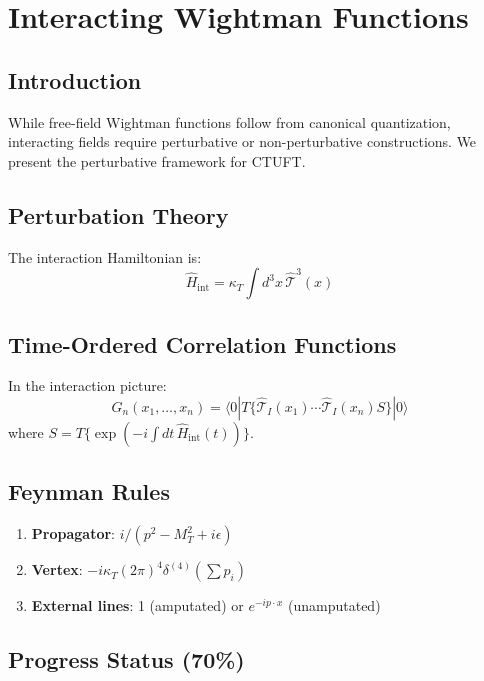 \section{Interacting Wightman Functions}
\label{sec:wightman_functions}

\subsection{Introduction}

While free-field Wightman functions follow from canonical quantization, interacting fields require perturbative or non-perturbative constructions. We present the perturbative framework for CTUFT.

\subsection{Perturbation Theory}

The interaction Hamiltonian is:
\begin{equation}
    \hat{H}_{\text{int}} = \kappa_T \int d^3x \, \hat{\mathcal{T}}^3(x)
\end{equation}

\subsection{Time-Ordered Correlation Functions}

In the interaction picture:
\begin{equation}
    G_n(x_1, \ldots, x_n) = \langle 0 | T\{\hat{\mathcal{T}}_I(x_1) \cdots \hat{\mathcal{T}}_I(x_n) S\} | 0 \rangle
\end{equation}
where $S = T\{\exp(-i\int dt \, \hat{H}_{\text{int}}(t))\}$.

\subsection{Feynman Rules}

\begin{enumerate}
    \item \textbf{Propagator}: $i/(p^2 - M_T^2 + i\epsilon)$
    \item \textbf{Vertex}: $-i\kappa_T (2\pi)^4 \delta^{(4)}(\sum p_i)$
    \item \textbf{External lines}: 1 (amputated) or $e^{-ip\cdot x}$ (unamputated)
\end{enumerate}

\subsection{Progress Status (70\%)}

